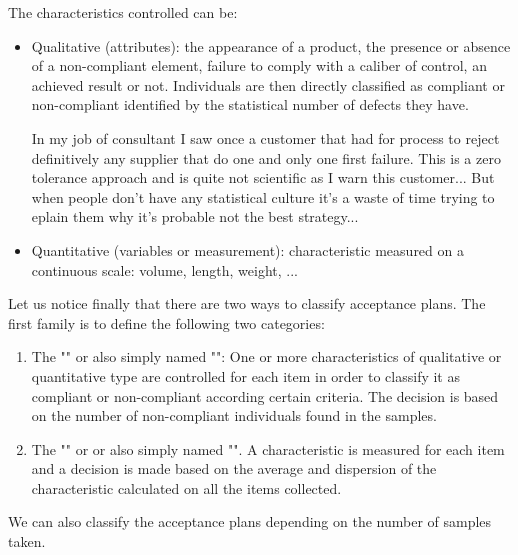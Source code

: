 	The characteristics controlled can be:
	\begin{itemize}
		\item Qualitative (attributes): the appearance of a product, the presence or absence of a non-compliant element, failure to comply with a caliber of control, an achieved result  or not. Individuals are then directly classified as compliant or non-compliant identified by the statistical number of defects they have. 
		
		\begin{tcolorbox}[title=Remark,colframe=black,arc=10pt]
		In my job of consultant I saw once a customer that had for process to reject definitively any supplier that do one and only one first failure. This is a zero tolerance approach and is quite not scientific as I warn this customer... But when people don't have any statistical culture it's a waste of time trying to eplain them why it's probable not the best strategy...
		\end{tcolorbox}

		\item Quantitative (variables or measurement): characteristic measured on a continuous scale: volume, length, weight, ...
	\end{itemize}
	Let us notice finally that there are two ways to classify acceptance plans. The first family is to define the following two categories:
	\begin{enumerate}
		\item The "" or also simply named "": One or more characteristics of qualitative or quantitative type are controlled for each item in order to classify it as compliant or non-compliant according certain criteria. The decision is based on the number of non-compliant individuals found in the samples.

		\item The "" or or also simply named "". A characteristic is measured for each item and a decision is made based on the average and dispersion of the characteristic calculated on all the items collected.
	\end{enumerate}
	We can also classify the acceptance plans depending on the number of samples taken.
